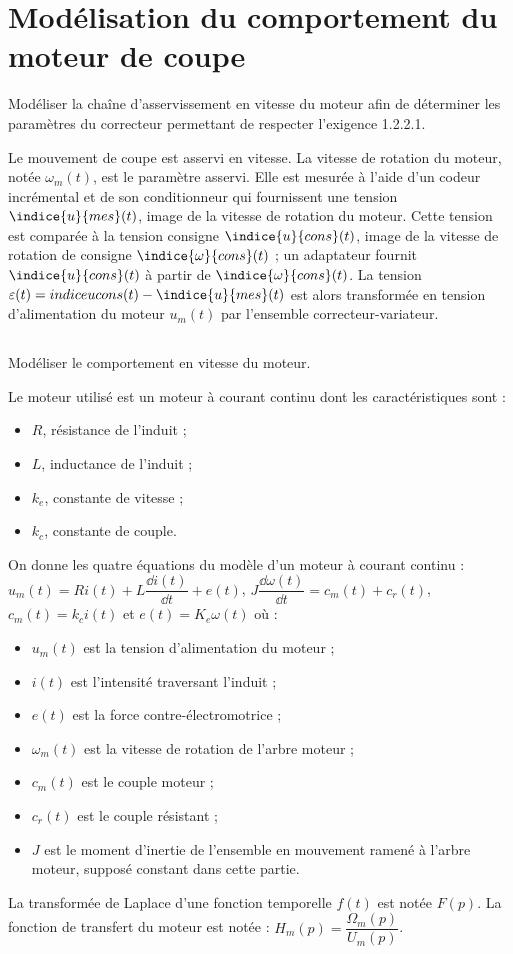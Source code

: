\section{Modélisation du comportement du moteur de coupe}
\begin{obj}
Modéliser la chaîne d’asservissement en vitesse du moteur afin de déterminer les paramètres du correcteur permettant de respecter l’exigence 1.2.2.1.
\end{obj}


Le mouvement de coupe est asservi en vitesse. La vitesse de rotation du moteur, notée $\omega_m (t)$, est le paramètre asservi. Elle est mesurée à l’aide d’un codeur incrémental et de son conditionneur qui fournissent une tension $\indice{u}{mes}(t)$, image de la vitesse de rotation du moteur. Cette tension est comparée à la tension consigne $\indice{u}{cons} (t)$, image de la vitesse de rotation de consigne $\indice{\omega}{cons} (t)$ ; un adaptateur fournit $\indice{u}{cons}(t)$ à partir de $\indice{\omega}{cons} (t)$. La tension $\varepsilon(t)=indice{u}{cons}(t) - \indice{u}{mes}(t)$ est alors transformée en tension d’alimentation du moteur $u_m (t)$ par l’ensemble correcteur-variateur.



\subsection{}
\begin{obj}
Modéliser le comportement en vitesse du moteur.
\end{obj}


Le moteur utilisé est un moteur à courant continu dont les caractéristiques sont :
\begin{itemize}
\item $R$, résistance de l’induit ;
\item $L$, inductance de l’induit ;
\item $k_e$, constante de vitesse ;
\item $k_c$, constante de couple.
\end{itemize}
On donne les quatre équations du modèle d’un moteur à courant continu :
$u_m (t)=R i(t)+L \dfrac{\dd i(t)}{\dd t}+e(t)$, $J \dfrac{\dd \omega(t)}{\dd t}=c_m (t)+c_r (t)$, $c_m (t)=k_c i(t)$ et $e(t)=K_e \omega(t)$ où :
\begin{itemize}
\item $u_m (t)$ est la tension d’alimentation du moteur ;
\item $i(t)$ est l’intensité traversant l’induit ;
\item $e(t)$ est la force contre-électromotrice ;
\item $\omega_m (t)$ est la vitesse de rotation de l’arbre moteur ;
\item $c_m (t)$ est le couple moteur ;
\item $c_r (t)$ est le couple résistant ;
\item $J$ est le moment d’inertie de l’ensemble en mouvement ramené à l’arbre moteur, supposé constant dans cette partie.
\end{itemize}

La transformée de Laplace d’une fonction temporelle $f(t)$ est notée $F(p)$.
La fonction de transfert du moteur est notée : $H_m (p)= \dfrac{\Omega_m (p)}{U_m (p)}$.


